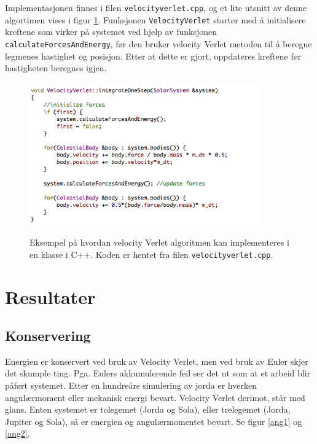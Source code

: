 \documentclass[11pt,a4paper]{article}
\begin{document}
Implementasjonen finnes i filen \texttt{velocityverlet.cpp}, og et lite utsnitt av denne algortimen vises i figur \ref{vv}. Funksjonen \texttt{VelocityVerlet} starter med å initialisere kreftene som virker på systemet ved hjelp av funksjonen \texttt{calculateForcesAndEnergy}, før den bruker velocity Verlet metoden til å beregne legmenes hastighet og posisjon. Etter at dette er gjort, oppdateres kreftene før hastigheten beregnes igjen.

\FloatBarrier
\begin{figure}[!ht]
\begin{center}
  \includegraphics[width = 100mm]{vv.png}\\
  \caption{Eksempel på hvordan velocity Verlet algoritmen kan implementeres i en klasse i C++. Koden er hentet fra filen \texttt{velocityverlet.cpp}.}   \label{vv}
  \end{center}
  \end{figure}
\FloatBarrier

\section{Resultater}
\subsection{Konservering}
Energien er konservert ved bruk av Velocity Verlet, men ved bruk av Euler skjer det skumple ting.
Pga. Eulers akkumulerende feil ser det ut som at et arbeid blir påført systemet. Etter en hundreårs simulering av jorda er hverken angulærmoment eller mekanisk energi bevart.
Velocity Verlet derimot, står med glans. Enten systemet er tolegemet (Jorda og Sola), eller trelegemet (Jorda, Jupiter og Sola), så er energien og angulærmomentet bevart. Se figur \ref{ang1} og \ref{ang2}.\\
\end{document}
